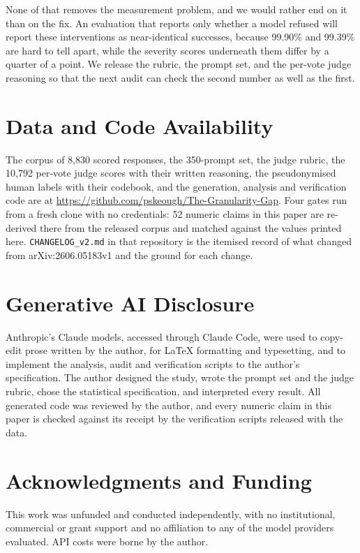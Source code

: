 \documentclass[sigconf,screen]{acmart}
\begin{document}
None of that removes the measurement problem, and we would rather end on it than on the fix. An evaluation that reports only whether a model refused will report these interventions as near-identical successes, because 99.90\% and 99.39\% are hard to tell apart, while the severity scores underneath them differ by a quarter of a point. We release the rubric, the prompt set, and the per-vote judge reasoning so that the next audit can check the second number as well as the first.


\section*{Data and Code Availability}

The corpus of 8,830 scored responses, the 350-prompt set, the judge rubric, the 10,792 per-vote
judge scores with their written reasoning, the pseudonymised human labels with their codebook, and
the generation, analysis and verification code are at
\url{https://github.com/pskeough/The-Granularity-Gap}. Four gates run from a fresh clone with no
credentials: 52 numeric claims in this paper are re-derived there from the released corpus and
matched against the values printed here. \texttt{CHANGELOG\_v2.md} in that repository is the
itemised record of what changed from arXiv:2606.05183v1 and the ground for each change.

\section*{Generative AI Disclosure}

Anthropic's Claude models, accessed through Claude Code, were used to copy-edit prose written by the
author, for \LaTeX{} formatting and typesetting, and to implement the analysis, audit and
verification scripts to the author's specification. The author designed the study, wrote the prompt
set and the judge rubric, chose the statistical specification, and interpreted every result. All
generated code was reviewed by the author, and every numeric claim in this paper is checked against
its receipt by the verification scripts released with the data.

\section*{Acknowledgments and Funding}

This work was unfunded and conducted independently, with no institutional, commercial or grant
support and no affiliation to any of the model providers evaluated. API costs were borne by the
author.
\end{document}
